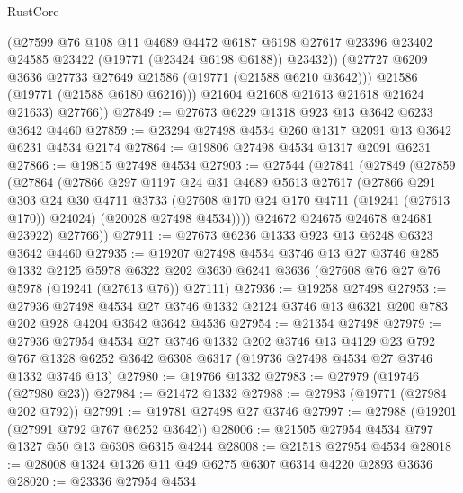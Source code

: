 \begin{lexlean}{RustCore}
\begin{coremodule}
              (@27599
                @76
                @108
                @11
                @4689
                @4472
                @6187
                @6198
                @27617
                @23396
                @23402
                @24585
                @23422
                (@19771 (@23424 @6198 @6188))
                @23432))
            (@27727 @6209 @3636 @27733 @27649 @21586 (@19771 (@21588 @6210 @3642)))
            @21586
            (@19771 (@21588 @6180 @6216)))
          @21604
          @21608
          @21613
          @21618
          @21624
          @21633)
        @27766))
@27849 := @27673 @6229 @1318 @923 @13 @3642 @6233 @3642 @4460
@27859 := @23294 @27498 @4534 @260 @1317 @2091 @13 @3642 @6231 @4534 @2174
@27864 := @19806 @27498 @4534 @1317 @2091 @6231
@27866 := @19815 @27498 @4534
@27903 := @27544
    (@27841
      (@27849
        (@27859
          (@27864
            (@27866
              @297
              @1197
              @24
              @31
              @4689
              @5613
              @27617
              (@27866
                @291
                @303
                @24
                @30
                @4711
                @3733
                (@27608 @170 @24 @170 @4711 (@19241 (@27613 @170)) @24024)
                (@20028 @27498 @4534))))
          @24672
          @24675
          @24678
          @24681
          @23922)
        @27766))
@27911 := @27673 @6236 @1333 @923 @13 @6248 @6323 @3642 @4460
@27935 := @19207
    @27498
    @4534
    @3746
    @13
    @27
    @3746
    @285
    @1332
    @2125
    @5978
    @6322
    @202
    @3630
    @6241
    @3636
    (@27608 @76 @27 @76 @5978 (@19241 (@27613 @76)) @27111)
@27936 := @19258 @27498
@27953 := @27936
    @27498
    @4534
    @27
    @3746
    @1332
    @2124
    @3746
    @13
    @6321
    @200
    @783
    @202
    @928
    @4204
    @3642
    @3642
    @4536
@27954 := @21354 @27498
@27979 := @27936
    @27954
    @4534
    @27
    @3746
    @1332
    @202
    @3746
    @13
    @4129
    @23
    @792
    @767
    @1328
    @6252
    @3642
    @6308
    @6317
    (@19736 @27498 @4534 @27 @3746 @1332 @3746 @13)
@27980 := @19766 @1332
@27983 := @27979 (@19746 (@27980 @23))
@27984 := @21472 @1332
@27988 := @27983 (@19771 (@27984 @202 @792))
@27991 := @19781 @27498 @27 @3746
@27997 := @27988 (@19201 (@27991 @792 @767 @6252 @3642))
@28006 := @21505 @27954 @4534 @797 @1327 @50 @13 @6308 @6315 @4244
@28008 := @21518 @27954 @4534
@28018 := @28008 @1324 @1326 @11 @49 @6275 @6307 @6314 @4220 @2893 @3636
@28020 := @23336 @27954 @4534

\end{coremodule}
\end{lexlean}
